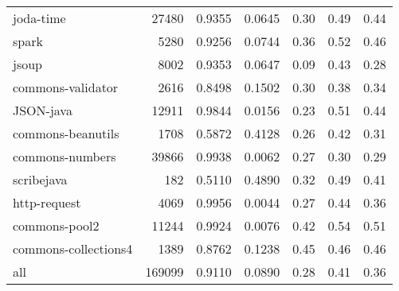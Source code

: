 \begin{table}
\begin{tabular}{lrrrrrr}
              joda-time &   27480 &          0.9355 &          0.0645 &         0.30 &         0.49 &             0.44 \\
                  spark &    5280 &          0.9256 &          0.0744 &         0.36 &         0.52 &             0.46 \\
                  jsoup &    8002 &          0.9353 &          0.0647 &         0.09 &         0.43 &             0.28 \\
      commons-validator &    2616 &          0.8498 &          0.1502 &         0.30 &         0.38 &             0.34 \\
              JSON-java &   12911 &          0.9844 &          0.0156 &         0.23 &         0.51 &             0.44 \\
      commons-beanutils &    1708 &          0.5872 &          0.4128 &         0.26 &         0.42 &             0.31 \\
        commons-numbers &   39866 &          0.9938 &          0.0062 &         0.27 &         0.30 &             0.29 \\
             scribejava &     182 &          0.5110 &          0.4890 &         0.32 &         0.49 &             0.41 \\
           http-request &    4069 &          0.9956 &          0.0044 &         0.27 &         0.44 &             0.36 \\
          commons-pool2 &   11244 &          0.9924 &          0.0076 &         0.42 &         0.54 &             0.51 \\
   commons-collections4 &    1389 &          0.8762 &          0.1238 &         0.45 &         0.46 &             0.46 \\
                    all &  169099 &          0.9110 &          0.0890 &         0.28 &         0.41 &             0.36 \\
\bottomrule
\end{tabular}
\end{table}
